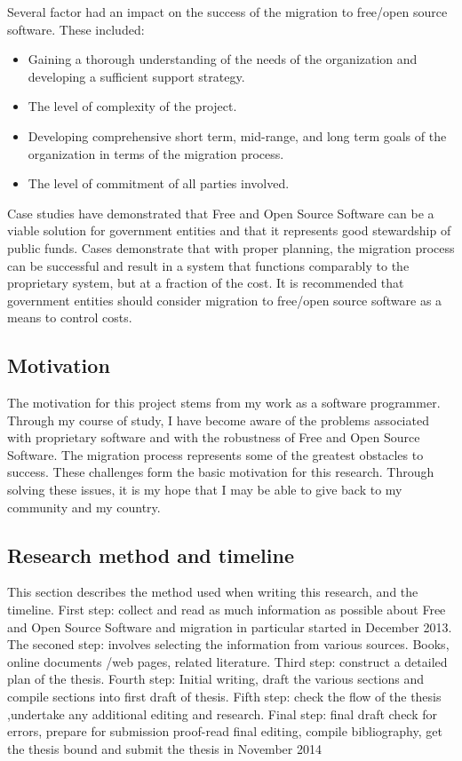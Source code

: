   Several factor had an impact on the success of the migration to free/open source software. These included: 
  \begin{itemize}
  \item Gaining a thorough understanding of the needs of the organization and developing 	a sufficient support strategy.
  \item The level of complexity of the project.
  \item Developing comprehensive short term, mid-range, and long term goals of the organization in terms of the migration process.
  \item The level of commitment of all parties involved.
  \end{itemize}
 
  Case studies have demonstrated that Free and Open Source Software can be a viable solution for government entities and that it represents good stewardship of public funds. Cases demonstrate that with proper planning, the migration process can be successful and result in a system that functions comparably to the proprietary system, but at a fraction of the cost. It is recommended that government entities should consider migration to free/open source software as a means to control costs. 

  \subsection{Motivation}
  The motivation for this project stems from my work as a software programmer. Through my course of study, I have become aware of the problems associated with proprietary software and with the robustness of Free and Open Source Software. The migration process represents some of the greatest obstacles to success. These challenges form the basic motivation for this research. Through solving these issues, it is my hope that I may be able to give back to my community and my country. 



  \subsection{Research method and timeline}
  This section describes the method used when writing this research, and the timeline.
  First step: collect and read as much information as possible about Free and Open Source Software and migration in particular started in December 2013. The seconed step: involves selecting the information from various sources. Books, online documents /web pages, related literature. Third step: construct a detailed plan of the thesis.
 Fourth step: Initial writing, draft the various sections and compile sections into first draft of thesis. Fifth step: check the flow of the thesis ,undertake any additional editing and research. Final step: final draft check for errors, prepare for submission proof-read  final editing, compile bibliography, get the thesis bound and submit the thesis in November 2014
 

